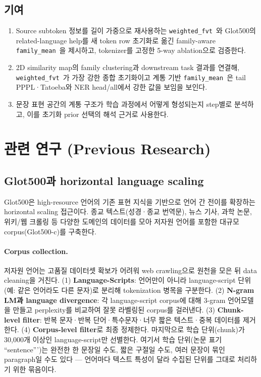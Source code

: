 \documentclass[11pt,a4paper]{article}
\newcommand{\wfvt}{\texttt{weighted\_fvt}}
\newcommand{\famm}{\texttt{family\_mean}}
\begin{document}
\subsection{기여}
\begin{enumerate}\setlength\itemsep{0.15em}
\item Source subtoken 정보를 길이 가중으로 재사용하는 \wfvt\ 와 Glot500의 related-language help를 새 token row 초기화로 옮긴 family-aware \famm\ 을 제시하고, tokenizer를 고정한 5-way ablation으로 검증한다.
\item 2D similarity map의 family clustering과 downstream task 결과를 연결해, \wfvt\ 가 가장 강한 종합 초기화이고 계통 기반 \famm\ 은 tail PPPL·Tatoeba와 NER head/all에서 강한 값을 보임을 보인다.
\item 문장 표현 공간의 계통 구조가 학습 과정에서 어떻게 형성되는지 step별로 분석하고, 이를 초기화 prior 선택의 해석 근거로 사용한다.
\end{enumerate}

\section{관련 연구 (Previous Research)}

\subsection{Glot500과 horizontal language scaling}
Glot500은 high-resource 언어의 기존 표현 지식을 기반으로 언어 간 전이를 확장하는 horizontal scaling 접근이다. 종교 텍스트(성경·종교 번역문), 뉴스 기사, 과학 논문, 위키/웹 크롤링 등 다양한 도메인의 데이터를 모아 저자원 언어를 포함한 대규모 corpus(Glot500-c)를 구축한다.

\paragraph{Corpus collection.} 저자원 언어는 고품질 데이터셋 확보가 어려워 web crawling으로 원천을 모은 뒤 data cleaning을 거친다. (1) \textbf{Language-Scripts}: 언어만이 아니라 language-script 단위(예: 같은 언어라도 다른 문자)로 분리해 tokenization 병목을 구분한다. (2) \textbf{N-gram LM과 language divergence}: 각 language-script corpus에 대해 3-gram 언어모델을 만들고 perplexity를 비교하여 잘못 라벨링된 corpus를 걸러낸다. (3) \textbf{Chunk-level filter}: 반복 문자·반복 단어·특수문자·너무 짧은 텍스트·중복 데이터를 제거한다. (4) \textbf{Corpus-level filter}로 최종 정제한다. 마지막으로 학습 단위(chunk)가 30{,}000개 이상인 language-script만 선별한다. 여기서 학습 단위(논문 표기 ``sentence''')는 완전한 한 문장일 수도, 짧은 구절일 수도, 여러 문장이 묶인 paragraph일 수도 있다 --- 언어마다 텍스트 특성이 달라 수집된 단위를 그대로 처리하기 위한 묶음이다.
\end{document}
